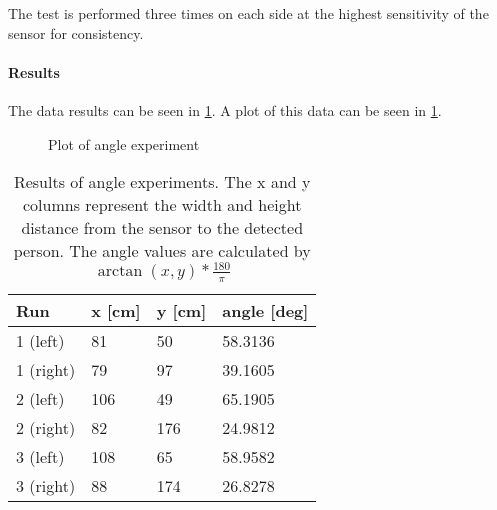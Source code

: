 The test is performed three times on each side at the highest sensitivity of the sensor for consistency.

\paragraph{Results}
\label{subp:AngResults}

The data results can be seen in \cref{tab:pir_angle}. A plot of this data can be
seen in \cref{fig:pir_angle}.

\begin{figure}[htbp]
\centering
{}
\caption[Angle experiment]{Plot of angle experiment}\label{fig:pir_angle}
\end{figure}

\begin{table}[htbp]
\centering
\begin{tabular}{@{}llll@{}}
\toprule
Run & x [cm] & y [cm] & angle [deg] \\ \midrule
1 (left) & 81 & 50 & 58.3136 \\
1 (right) & 79 & 97 & 39.1605  \\ \midrule
2 (left) & 106 & 49 & 65.1905 \\
2 (right) & 82 & 176 & 24.9812 \\ \midrule
3 (left) & 108 & 65 & 58.9582 \\
3 (right) & 88 & 174 & 26.8278 \\ \bottomrule
\end{tabular}
\caption[Angle experiment results]{Results of angle experiments. The x and y columns represent the width and height
  distance from the sensor to the detected person. The angle values are
  calculated by $\arctan (x,y) * \frac{180}{\pi}$}
\label{tab:pir_angle}
\end{table}

